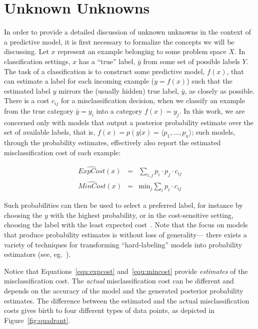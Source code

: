 \section{Unknown Unknowns}
\label{sec:unknowns}

In order to provide a detailed discussion of unknown unknowns in the context of a predictive model, it is first necessary to formalize the concepts we will be discussing. Let $x$ represent an example belonging to some problem space $X$. In classification settings, $x$ has a ``true'' label, $\bar{y}$ from some set of possible labels $Y$. The task of a classification is to construct some predictive model, $f(x)$, that can estimate a label for each incoming example ($y = f(x)$) such that the estimated label $y$ mirrors the (usually hidden) true label, $\bar{y}$, as closely as possible. There is a cost $c_{ij}$ for a misclassification decision, when we classify an example from the true category $\bar{y}=y_i$ into a category $f(x)=y_j$. In this work, we are concerned only with models that output a posterior probability estimate over the set of available labels, that is, $f(x) = p(y | x) = \langle p_1, \ldots, p_n \rangle$; such models, through the probability estimates, effectively also  report the estimated misclassification cost of each example:

\begin{eqnarray}
\widehat{\mathit{ExpCost}}(x) & = & \sum_{i,j} p_i \cdot p_j \cdot c_{ij} \label{equ:expcost} \\
\widehat{\mathit{MinCost}}(x) & = & \mbox{min}_j \sum_{i} p_i \cdot c_{ij} \label{equ:mincost}
\end{eqnarray}

Such probabilities can then be used to select a preferred label, for instance by choosing the $y$ with the highest probability, or in the cost-sensitive setting, choosing the label with the least expected cost~\cite{elkan:2001cost}. Note that the focus on models that produce probability estimates is without loss of generality--- there exists a variety of techniques for transforming ``hard-labeling'' models into probability estimators (see, eg.~\cite{domingos1999metacost, Platt99probabilisticoutputs}).

Notice that Equations~\ref{equ:expcost} and~\ref{equ:mincost} provide \emph{estimates} of the misclassification cost. The \emph{actual} misclassification cost can be different and depends on the accuracy of the model and the generated posterior probability estimates. The difference between the estimated and the 
actual misclassification costs gives birth to four different types of data points, as depicted in Figure~\ref{fig:quadrant}.

